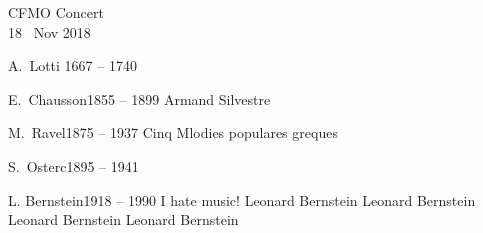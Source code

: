 \documentclass[letter,6pt,poets]{ConcProg}
\begin{document}
\begin{programme}{
    CFMO Concert
\\  {\normalsize 18 ~Nov 2018}
}
\begin{part}[]
    \begin{composition}{A.~Lotti}    {1667 -- 1740}{}{}
                    {}{}
    \end{composition}

    \begin{composition}{E.~Chausson}{1855 -- 1899}{}{}
          {}             {Armand Silvestre}
                   {}               
         {}             {}                
    \end{composition}

    \begin{composition}{M.~Ravel}{1875 -- 1937}%
                       {Cinq Mlodies populares greques}{}
                     {}{}{}
                  {}{}
               {}{}
                                        {}{}
    \end{composition}

    \begin{composition}{S.~Osterc}{1895 -- 1941}{}{}
                      {}{}
                 {}{}
                      {}{}
                  {}{}
    \end{composition}

    \begin{composition}{L. Bernstein}{1918 -- 1990}%
                       {I hate music!}{}
               {}{Leonard Bernstein}
                 {}{Leonard Bernstein}
                 {}{Leonard Bernstein}
       {}{Leonard Bernstein}
    \end{composition}
  \end{part}
\end{programme}
\end{document}
